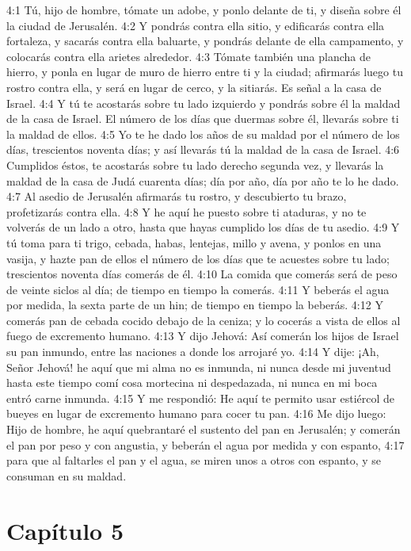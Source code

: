 4:1 Tú, hijo de hombre, tómate un adobe, y ponlo delante de ti, y diseña sobre él la ciudad de Jerusalén.   
4:2 Y pondrás contra ella sitio, y edificarás contra ella fortaleza, y sacarás contra ella baluarte, y pondrás delante de ella campamento, y colocarás contra ella arietes alrededor.   
4:3 Tómate también una plancha de hierro, y ponla en lugar de muro de hierro entre ti y la ciudad; afirmarás luego tu rostro contra ella, y será en lugar de cerco, y la sitiarás. Es señal a la casa de Israel.   
4:4 Y tú te acostarás sobre tu lado izquierdo y pondrás sobre él la maldad de la casa de Israel. El número de los días que duermas sobre él, llevarás sobre ti la maldad de ellos.   
4:5 Yo te he dado los años de su maldad por el número de los días, trescientos noventa días; y así llevarás tú la maldad de la casa de Israel.   
4:6 Cumplidos éstos, te acostarás sobre tu lado derecho segunda vez, y llevarás la maldad de la casa de Judá cuarenta días; día por año, día por año te lo he dado.   
4:7 Al asedio de Jerusalén afirmarás tu rostro, y descubierto tu brazo, profetizarás contra ella.   
4:8 Y he aquí he puesto sobre ti ataduras, y no te volverás de un lado a otro, hasta que hayas cumplido los días de tu asedio.   
4:9 Y tú toma para ti trigo, cebada, habas, lentejas, millo y avena, y ponlos en una vasija, y hazte pan de ellos el número de los días que te acuestes sobre tu lado; trescientos noventa días comerás de él.   
4:10 La comida que comerás será de peso de veinte siclos   al día; de tiempo en tiempo la comerás.   
4:11 Y beberás el agua por medida, la sexta parte de un hin; de tiempo en tiempo la beberás.   
4:12 Y comerás pan de cebada cocido debajo de la ceniza; y lo cocerás a vista de ellos al fuego de excremento humano.   
4:13 Y dijo Jehová: Así comerán los hijos de Israel su pan inmundo, entre las naciones a donde los arrojaré yo.   
4:14 Y dije: ¡Ah, Señor Jehová! he aquí que mi alma no es inmunda, ni nunca desde mi juventud hasta este tiempo comí cosa mortecina ni despedazada, ni nunca en mi boca entró carne inmunda.   
4:15 Y me respondió: He aquí te permito usar estiércol de bueyes en lugar de excremento humano para cocer tu pan.   
4:16 Me dijo luego: Hijo de hombre, he aquí quebrantaré el sustento del pan en Jerusalén; y comerán el pan por peso y con angustia, y beberán el agua por medida y con espanto,   
4:17 para que al faltarles el pan y el agua, se miren unos a otros con espanto, y se consuman en su maldad.   
\section*{Capítulo 5  }
  
